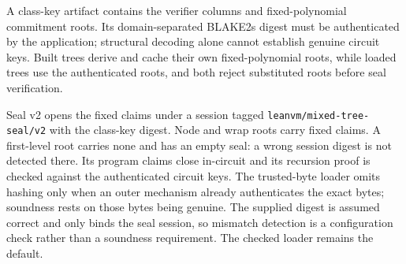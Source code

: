 A class-key artifact contains the verifier columns and fixed-polynomial commitment roots. Its domain-separated BLAKE2s digest must be authenticated by the application; structural decoding alone cannot establish genuine circuit keys. Built trees derive and cache their own fixed-polynomial roots, while loaded trees use the authenticated roots, and both reject substituted roots before seal verification.

Seal v2 opens the fixed claims under a session tagged \texttt{leanvm/mixed-tree-seal/v2} with the class-key digest. Node and wrap roots carry fixed claims. A first-level root carries none and has an empty seal: a wrong session digest is not detected there. Its program claims close in-circuit and its recursion proof is checked against the authenticated circuit keys. The trusted-byte loader omits hashing only when an outer mechanism already authenticates the exact bytes; soundness rests on those bytes being genuine. The supplied digest is assumed correct and only binds the seal session, so mismatch detection is a configuration check rather than a soundness requirement. The checked loader remains the default.

